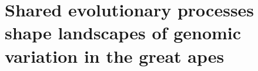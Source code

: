 







\chapter{Shared evolutionary processes shape landscapes of genomic variation in the great apes} 







